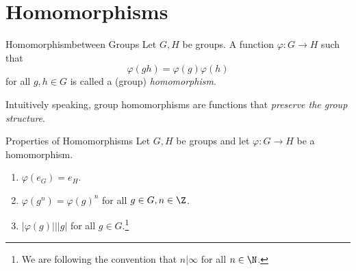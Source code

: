 \documentclass[pmath347]{subfiles}
\begin{document}
    \clearpage
    \section{Homomorphisms}

    \begin{definition}{Homomorphism}{between Groups}
        Let $G,H$ be groups. A function $\varphi:G\to H$ such that
        \begin{equation*}
            \varphi\left( gh \right) = \varphi\left( g \right) \varphi\left( h \right) 
        \end{equation*}
        for all $g,h\in G$ is called a (group) \emph{homomorphism}.
    \end{definition}

    \np Intuitively speaking, group homomorphisms are functions that \textit{preserve the group structure}.

    \begin{prop}{Properties of Homomorphisms}
        Let $G,H$ be groups and let $\varphi:G\to H$ be a homomorphism.
        \begin{enumerate}
            \item $\varphi\left( e_G \right) = e_H$.
            \item $\varphi\left( g^n \right) = \varphi\left( g \right) ^n$ for all $g\in G, n\in\Z$.
            \item $\left| \varphi\left( g \right)  \right| | \left| g \right|$ for all $g\in G$.\footnote{We are following the convention that $n|\infty$ for all $n\in\N$.}
        \end{enumerate}
    \end{prop}
\end{document}
